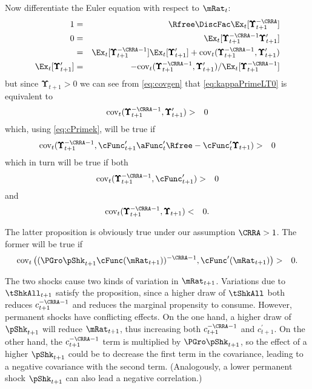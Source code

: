 \documentclass[titlepage]{\econtex}\providecommand{\texname}{BufferStockTheory}
\begin{document}
{Now differentiate the Euler equation with respect to $\mRat_{t}$:
\begin{eqnarray}
  1 & = & \Rfree \DiscFac \Ex_{t}[ \pmb{\Upsilon}_{t+1}^{-\CRRA}] \notag
\\ 0 & = & \Ex_{t}[\pmb{\Upsilon}_{t+1}^{-\CRRA-1} \pmb{\Upsilon}_{t+1}^{\prime}] \notag
\\ & = & \Ex_{t}[\pmb{\Upsilon}_{t+1}^{-\CRRA-1}]\Ex_{t}[\pmb{\Upsilon}_{t+1}^{\prime}]+\mbox{cov}_{t}(\pmb{\Upsilon}_{t+1}^{-\CRRA-1},\pmb{\Upsilon}_{t+1}^{\prime}) \notag
\\ \Ex_{t}[\pmb{\Upsilon}_{t+1}^{\prime}] & = & -\mbox{cov}_{t}(\pmb{\Upsilon}_{t+1}^{-\CRRA-1},\pmb{\Upsilon}_{t+1}^{\prime})/\Ex_{t}[\pmb{\Upsilon}_{t+1}^{-\CRRA-1}] \label{eq:covgen}
\end{eqnarray}
but since $\pmb{\Upsilon}_{t+1} > 0$ we can see from \eqref{eq:covgen} that \eqref{eq:kappaPrimeLT0} is equivalent to
\begin{eqnarray}
 \mbox{cov}_{t}(\pmb{\Upsilon}_{t+1}^{-\CRRA-1},\pmb{\Upsilon}_{t+1}^{\prime}) & > & 0 \nonumber
\end{eqnarray}
which, using \eqref{eq:cPrimek}, will be true if
\begin{eqnarray}
 \mbox{cov}_{t}(\pmb{\Upsilon}_{t+1}^{-\CRRA-1},\cFunc^{\prime}_{t+1}\aFunc^{\prime}_{t}\Rfree - \cFunc^{\prime}_{t}\pmb{\Upsilon}_{t+1}) & > & 0 \notag
\end{eqnarray}
which in turn will be true if both
\begin{eqnarray}
  \mbox{cov}_{t}(\pmb{\Upsilon}_{t+1}^{-\CRRA-1},\cFunc^{\prime}_{t+1} ) & > & 0 \notag
\end{eqnarray}
and
\begin{eqnarray*}
  \mbox{cov}_{t}(\pmb{\Upsilon}_{t+1}^{-\CRRA-1},\pmb{\Upsilon}_{t+1}) & < & 0. \notag
\end{eqnarray*}

The latter proposition is obviously true under our assumption $\CRRA > 1$.  The former will be true if
\begin{eqnarray*}
  \mbox{cov}_{t}\left((\PGro \pShk_{t+1} \cFunc(\mRat_{t+1}))^{-\CRRA-1},\cFunc^{\prime}(\mRat_{t+1}) \right) & > & 0 \nonumber.
\end{eqnarray*}}

The two shocks cause two kinds of variation in $\mRat_{t+1}$.
Variations due to $\tShkAll_{t+1}$ satisfy the proposition, since a
higher draw of $\tShkAll$ both reduces $c_{t+1}^{-\CRRA-1}$ and
reduces the marginal propensity to consume.  However, permanent shocks
have conflicting effects.  On the one hand, a higher draw of
$\pShk_{t+1}$ will reduce $\mRat_{t+1}$, thus increasing both
$c_{t+1}^{-\CRRA-1}$ and $c_{t+1}^{\prime}$.  On the other hand, the
$c_{t+1}^{-\CRRA-1}$ term is multiplied by $\PGro \pShk_{t+1}$, so the
effect of a higher $\pShk_{t+1}$ could be to decrease the first term
in the covariance, leading to a negative covariance with the second
term.  (Analogously, a lower permanent shock $\pShk_{t+1}$ can also
lead a negative correlation.)
\end{document}
